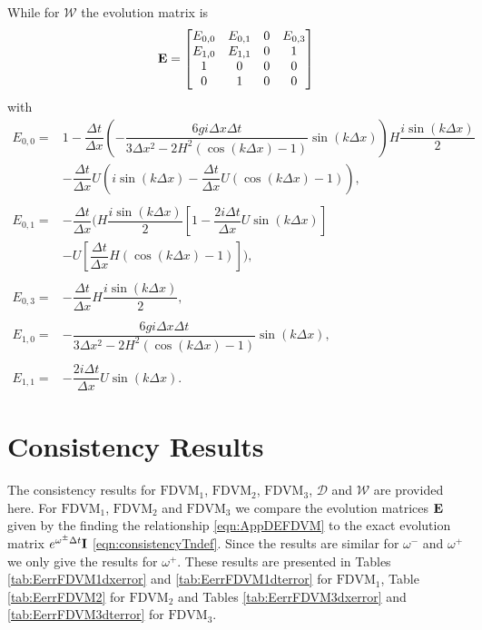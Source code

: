 While for $\mathcal{W}$ the evolution matrix is 
\begin{equation}
\label{eqn:AppEvolW}
\mathbf{E} = \begin{bmatrix}
{E}_{0,0} & {E}_{0,1} & 0 & E_{0,3} \\
{E}_{1,0} & E_{1,1} &0 & 1 \\
1&0&0&0\\
0&1&0&0
\end{bmatrix}
\end{equation}
with
\begin{align*}
{E}_{0,0} = &1 - \dfrac{\Delta t}{\Delta x}\left(-\dfrac{6 gi \Delta x\Delta t}{3 \Delta x^2 -2{H^2} \left( \cos\left(k \Delta x\right) - 1 \right)}{ \sin\left(k \Delta x\right)}\right)H\dfrac{i\sin\left(k\Delta x\right)}{2} \\  & - \dfrac{\Delta t}{\Delta x}U\left(i\sin\left(k\Delta x\right) - \dfrac{\Delta t}{\Delta x}U\left(\cos\left(k\Delta x\right) - 1\right)\right), \\ \\
{E}_{0,1} = &- \dfrac{\Delta t}{\Delta x} \Bigg(H\dfrac{i\sin\left(k\Delta x\right)}{2}\left[ 1 -\dfrac{2i \Delta t }{\Delta x} U \sin\left(k \Delta x\right) \right] \\ & -U\left[\dfrac{\Delta t}{\Delta x}H\left(\cos\left(k\Delta x\right) - 1\right)\right] \Bigg),\\ \\
E_{0,3} = &- \dfrac{\Delta t}{\Delta x}H\dfrac{i\sin\left(k\Delta x\right)}{2},  \\ \\
 {E}_{1,0} = &-\dfrac{6 gi \Delta x\Delta t}{3 \Delta x^2 -2{H^2} \left( \cos\left(k \Delta x\right) - 1 \right)}{ \sin\left(k \Delta x\right)}, \\ \\
{E}_{1,1} = &-\dfrac{2i \Delta t }{\Delta x} U \sin\left(k \Delta x\right).
\end{align*}

\section{Consistency Results}
The consistency results for $\text{FDVM}_1$, $\text{FDVM}_2$, $\text{FDVM}_3$, $\mathcal{D}$ and $\mathcal{W}$ are provided here. For $\text{FDVM}_1$, $\text{FDVM}_2$ and $\text{FDVM}_3$ we compare the evolution matrices $\mathbf{E}$ given by the finding the relationship \eqref{eqn:AppDEFDVM} to the exact evolution matrix $e^{\omega^\pm \Delta t } \mathbf{I}$ \eqref{eqn:consistencyTndef}. Since the results are similar for $\omega^-$ and $\omega^+$ we only give the results for $\omega^+$. These results are presented in Tables \ref{tab:EerrFDVM1dxerror} and \ref{tab:EerrFDVM1dterror} for $\text{FDVM}_1$, Table \ref{tab:EerrFDVM2} for $\text{FDVM}_2$ and Tables \ref{tab:EerrFDVM3dxerror} and \ref{tab:EerrFDVM3dterror} for $\text{FDVM}_3$.


